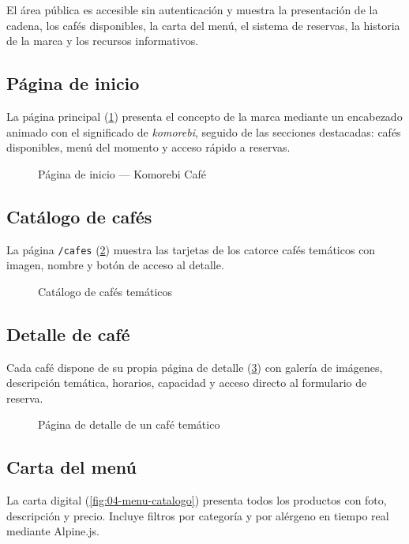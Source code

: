 \documentclass[12pt,a4paper,twoside,openright]{report}
\begin{document}
El área pública es accesible sin autenticación y muestra la presentación de la cadena,
los cafés disponibles, la carta del menú, el sistema de reservas, la historia de la
marca y los recursos informativos.

\subsection{Página de inicio}
La página principal (\cref{fig:01-home}) presenta el concepto de la marca mediante
un encabezado animado con el significado de \textit{komorebi}, seguido de las
secciones destacadas: cafés disponibles, menú del momento y acceso rápido a reservas.

\begin{figure}[H]
  \centering
  \fbox{\rule{0pt}{6cm}\rule{12cm}{0pt}}
  \caption{Página de inicio — Komorebi Café}
  \label{fig:01-home}
\end{figure}

\subsection{Catálogo de cafés}
La página \texttt{/cafes} (\cref{fig:02-cafes-lista}) muestra las tarjetas de los
catorce cafés temáticos con imagen, nombre y botón de acceso al detalle.

\begin{figure}[H]
  \centering
  \fbox{\rule{0pt}{6cm}\rule{12cm}{0pt}}
  \caption{Catálogo de cafés temáticos}
  \label{fig:02-cafes-lista}
\end{figure}

\subsection{Detalle de café}
Cada café dispone de su propia página de detalle (\cref{fig:03-cafe-detalle}) con
galería de imágenes, descripción temática, horarios, capacidad y acceso directo al
formulario de reserva.

\begin{figure}[H]
  \centering
  \fbox{\rule{0pt}{6cm}\rule{12cm}{0pt}}
  \caption{Página de detalle de un café temático}
  \label{fig:03-cafe-detalle}
\end{figure}

\subsection{Carta del menú}
La carta digital (\cref{fig:04-menu-catalogo}) presenta todos los productos con
foto, descripción y precio. Incluye filtros por categoría y por alérgeno en tiempo
real mediante Alpine.js.
\end{document}

